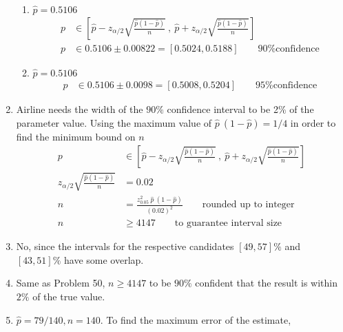 \begin{enumerate}
		\begin{enumerate}
			\item $ \widehat{p}  = 0.5106$ \\
			\begin{align}
				p &\in \left[ \widehat{p} - z_{\alpha/2}\sqrt{\frac{\widehat{p}(1-\widehat{p})}{n}}\ ,\ \widehat{p} + z_{\alpha/2}\sqrt{\frac{\widehat{p}(1-\widehat{p})}{n}}  \right] \nonumber \\
				p &\in 0.5106 \pm 0.00822 = [0.5024, 0.5188] \qquad \text{90\% confidence}
			\end{align}
			
			\item $ \widehat{p}  = 0.5106$ \\
			\begin{align}
				p &\in 0.5106 \pm 0.0098 = [0.5008, 0.5204] \qquad \text{95\% confidence}
			\end{align}
		\end{enumerate}
	
	
	\item  Airline needs the width of the $ 90\% $ confidence interval to be 2\% of the parameter value. Using the maximum value of $ \widehat{p}\ (1-\widehat{p}) = 1/4 $ in order to find the minimum bound on $ n $\\
	
	
		\begin{align}		
			p &\in \left[ \widehat{p} - z_{\alpha/2}\sqrt{\frac{\widehat{p}(1-\widehat{p})}{n}}\ ,\ \widehat{p} + z_{\alpha/2}\sqrt{\frac{\widehat{p}(1-\widehat{p})}{n}}  \right] \nonumber \\
			z_{\alpha/2}\sqrt{\frac{\widehat{p}(1-\widehat{p})}{n}} &= 0.02 \nonumber \\
			n &= \frac{z_{0.05}^2\ \widehat{p}\ (1-\widehat{p})}{(0.02)^2} \qquad \text{rounded up to integer} \nonumber \\
			n &\geq 4147 \qquad \text{to guarantee interval size}
		\end{align}
	
	
	\item No, since the intervals for the respective candidates $ [49, 57]\% $ and $ [43, 51]\% $ have some overlap.
	
	\item Same as Problem 50, $ n \geq 4147 $ to be $ 90\% $ confident that the result is within $ 2\% $ of the true value.
	
	\item $ \widehat{p}  = 79/140, n = 140$. To find the maximum error of the estimate,
	

\end{enumerate}

